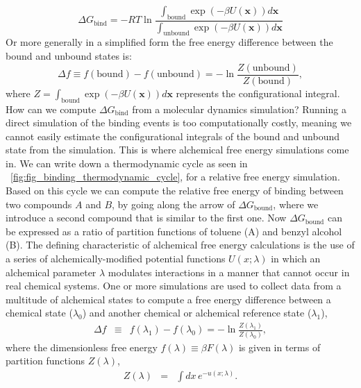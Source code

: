 \documentclass[9pt,bestpractices]{livecoms}
\begin{document}
\begin{equation}
    \Delta G_{\mathrm{bind}} = -RT\ln\frac{\int_\mathrm{bound} \exp(-\beta U(\mathbf{x}))d\mathbf{x}}{\int_\mathrm{unbound} \exp(-\beta U(\mathbf{x}))d\mathbf{x}}
\end{equation}
Or more generally in a simplified form the free energy difference between the bound and unbound states is:
\begin{equation}
\Delta f \equiv f(\mathrm{bound}) - f(\mathrm{unbound}) = -\ln\frac{Z(\mathrm{unbound})}{Z({\mathrm{bound}})},
\end{equation}
where $Z = \int_\mathrm{bound} \exp(-\beta U(\mathbf{x}))d\mathbf{x}$ represents the configurational integral. 
How can we compute $\Delta G_{\mathrm{bind}}$ from a molecular dynamics simulation? Running a direct simulation of the binding events is too computationally costly, meaning we cannot easily estimate the configurational integrals of the bound and unbound state from the simulation. This is where alchemical free energy simulations come in. We can write down a thermodynamic cycle as seen in ~\ref{fig:fig_binding_thermodynamic_cycle}, for a relative free energy simulation. Based on this cycle we can compute the relative free energy of binding between two compounds $A$ and $B$, by going along the arrow of $\Delta G_{\mathrm{bound}}$, where we introduce a second compound that is similar to the first one. Now $\Delta G_{\mathrm{bound}}$ can be expressed as a ratio of partition functions of toluene (A) and benzyl alcohol (B). 
The defining characteristic of alchemical free energy calculations is the use of a series of alchemically-modified potential functions $U(x; \lambda)$ in which an alchemical parameter $\lambda$ modulates interactions in a manner that cannot occur in real chemical systems.
One or more simulations are used to collect data from a multitude of alchemical states to compute a free energy difference between a chemical state ($\lambda_0$) and another chemical or alchemical reference state ($\lambda_1$),
\begin{eqnarray}
\Delta f &\equiv& f(\lambda_1) - f(\lambda_0) = - \ln \frac{Z(\lambda_1)}{Z(\lambda_0)} , \label{equation:dimensionless-free-energy-difference}
\end{eqnarray}
where the dimensionless free energy $f(\lambda) \equiv \beta F(\lambda)$ is given in terms of partition functions $Z(\lambda)$,
\begin{eqnarray}
Z(\lambda) &=& \int dx \, e^{-u(x; \lambda)} .
\label{equation:partition-function-definition}
\end{eqnarray}
\end{document}
